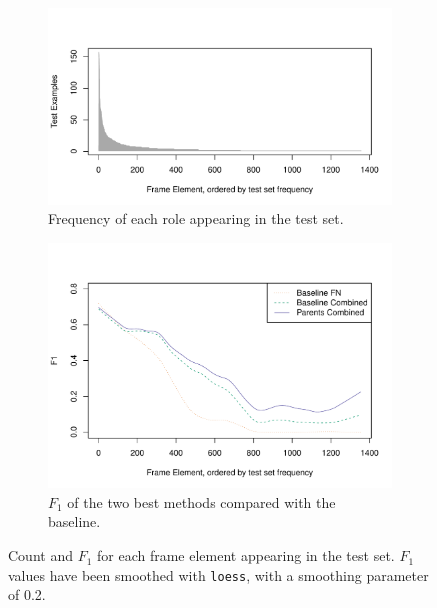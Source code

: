 \documentclass[11pt,a4paper]{article}
\begin{document}
\begin{figure}[t]
	\begin{subfigure}[b]{0.5\textwidth}
		\includegraphics[width=\textwidth]{fig/num_instances}
		\caption{Frequency of each role appearing in the test set.}\label{fig:num_inst}
	\end{subfigure}
	\begin{subfigure}[b]{0.5\textwidth}
		\vspace{-1cm}
		\includegraphics[width=\textwidth]{fig/f1_sorted_by_num_instances}
		\caption{$F_1$ of the two best methods compared with the baseline.}\label{fig:coolplot}
	\end{subfigure}
	\caption{Count and $F_1$ for each frame element appearing in the test set. $F_1$ values have been smoothed with \texttt{loess}, with a smoothing parameter of 0.2.}
\end{figure}
\end{document}
